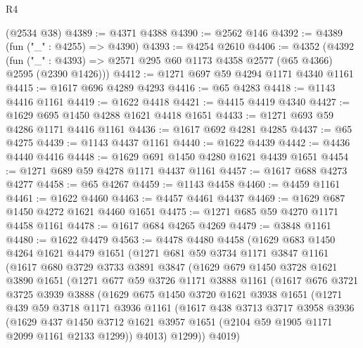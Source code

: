 \begin{lexlean}{R4}
\begin{coremodule}
    (@2534 @38)
@4389 := @4371 @4388
@4390 := @2562 @146
@4392 := @4389 (fun ("_" : @4255) => @4390)
@4393 := @4254 @2610
@4406 := @4352
    (@4392 (fun ("_" : @4393) => @2571 @295 @60 @1173 @4358 @2577 (@65 @4366) @2595 (@2390 @1426)))
@4412 := @1271 @697 @59 @4294 @1171 @4340 @1161
@4415 := @1617 @696 @4289 @4293
@4416 := @65 @4283
@4418 := @1143 @4416 @1161
@4419 := @1622 @4418
@4421 := @4415 @4419 @4340
@4427 := @1629 @695 @1450 @4288 @1621 @4418 @1651
@4433 := @1271 @693 @59 @4286 @1171 @4416 @1161
@4436 := @1617 @692 @4281 @4285
@4437 := @65 @4275
@4439 := @1143 @4437 @1161
@4440 := @1622 @4439
@4442 := @4436 @4440 @4416
@4448 := @1629 @691 @1450 @4280 @1621 @4439 @1651
@4454 := @1271 @689 @59 @4278 @1171 @4437 @1161
@4457 := @1617 @688 @4273 @4277
@4458 := @65 @4267
@4459 := @1143 @4458
@4460 := @4459 @1161
@4461 := @1622 @4460
@4463 := @4457 @4461 @4437
@4469 := @1629 @687 @1450 @4272 @1621 @4460 @1651
@4475 := @1271 @685 @59 @4270 @1171 @4458 @1161
@4478 := @1617 @684 @4265 @4269
@4479 := @3848 @1161
@4480 := @1622 @4479
@4563 := @4478
    @4480
    @4458
    (@1629
      @683
      @1450
      @4264
      @1621
      @4479
      @1651
      (@1271
        @681
        @59
        @3734
        @1171
        @3847
        @1161
        (@1617
          @680
          @3729
          @3733
          @3891
          @3847
          (@1629
            @679
            @1450
            @3728
            @1621
            @3890
            @1651
            (@1271
              @677
              @59
              @3726
              @1171
              @3888
              @1161
              (@1617
                @676
                @3721
                @3725
                @3939
                @3888
                (@1629
                  @675
                  @1450
                  @3720
                  @1621
                  @3938
                  @1651
                  (@1271
                    @439
                    @59
                    @3718
                    @1171
                    @3936
                    @1161
                    (@1617
                      @438
                      @3713
                      @3717
                      @3958
                      @3936
                      (@1629
                        @437
                        @1450
                        @3712
                        @1621
                        @3957
                        @1651
                        (@2104 @59 @1905 @1171 @2099 @1161 @2133 @1299))
                      @4013)
                    @1299))
                @4019)

\end{coremodule}
\end{lexlean}
